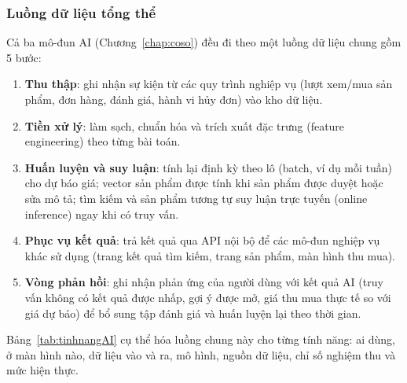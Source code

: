 \subsubsection*{Luồng dữ liệu tổng thể}

Cả ba mô-đun AI (Chương~\ref{chap:coso}) đều đi theo một luồng dữ liệu chung gồm 5 bước:
\begin{enumerate}
    \item \textbf{Thu thập}: ghi nhận sự kiện từ các quy trình nghiệp vụ (lượt xem/mua sản phẩm, đơn hàng, đánh giá, hành vi hủy đơn) vào kho dữ liệu.
    \item \textbf{Tiền xử lý}: làm sạch, chuẩn hóa và trích xuất đặc trưng (feature engineering) theo từng bài toán.
    \item \textbf{Huấn luyện và suy luận}: tính lại định kỳ theo lô (batch, ví dụ mỗi tuần) cho dự báo giá; vector sản phẩm được tính khi sản phẩm được duyệt hoặc sửa mô tả; tìm kiếm và sản phẩm tương tự suy luận trực tuyến (online inference) ngay khi có truy vấn.
    \item \textbf{Phục vụ kết quả}: trả kết quả qua API nội bộ để các mô-đun nghiệp vụ khác sử dụng (trang kết quả tìm kiếm, trang sản phẩm, màn hình thu mua).
    \item \textbf{Vòng phản hồi}: ghi nhận phản ứng của người dùng với kết quả AI (truy vấn không có kết quả được nhấp, gợi ý được mở, giá thu mua thực tế so với giá dự báo) để bổ sung tập đánh giá và huấn luyện lại theo thời gian.
\end{enumerate}

Bảng~\ref{tab:tinhnangAI} cụ thể hóa luồng chung này cho từng tính năng: ai dùng, ở màn hình nào, dữ liệu vào và ra, mô hình, nguồn dữ liệu, chỉ số nghiệm thu và mức hiện thực.

